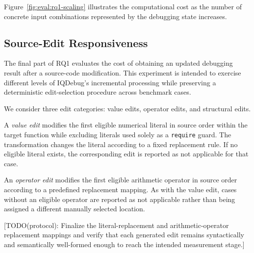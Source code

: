 \documentclass[11pt,oneside]{report}
\theoremstyle{plain}
\theoremstyle{definition}
\theoremstyle{remark}
\begin{document}
Figure~\ref{fig:eval:rq1-scaling} illustrates the computational cost as the number of concrete input combinations represented by the debugging state increases.



\subsection{Source-Edit Responsiveness}
\label{subsec:eval:rq1:edit}

The final part of RQ1 evaluates the cost of obtaining an updated debugging result after a source-code modification. This experiment is intended to exercise different levels of IQDebug's incremental processing while preserving a deterministic edit-selection procedure across benchmark cases.

We consider three edit categories: value edits, operator edits, and structural edits.

A \textit{value edit} modifies the first eligible numerical literal in source order within the target function while excluding literals used solely as a \texttt{require} guard. The transformation changes the literal according to a fixed replacement rule. If no eligible literal exists, the corresponding edit is reported as not applicable for that case.

An \textit{operator edit} modifies the first eligible arithmetic operator in source order according to a predefined replacement mapping. As with the value edit, cases without an eligible operator are reported as not applicable rather than being assigned a different manually selected location.

[TODO(protocol): Finalize the literal-replacement and arithmetic-operator replacement mappings and verify that each generated edit remains syntactically and semantically well-formed enough to reach the intended measurement stage.]
\end{document}

